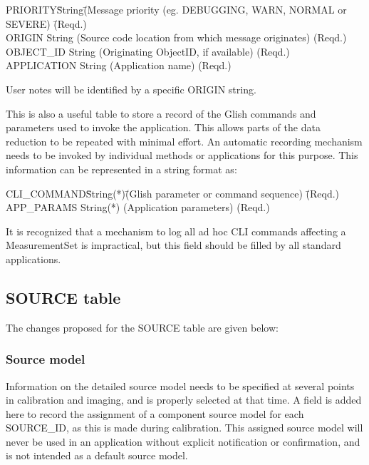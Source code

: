 \documentclass{article}
\begin{document}
\begin{tabbing}
PRIORITY\quad\quad\quad \= String\quad\quad \= 
(Message priority (eg. DEBUGGING, WARN, NORMAL or SEVERE)
 \quad\quad \= (Reqd.) \\
ORIGIN             \> String  \> 
(Source code location from which message originates) \> (Reqd.) \\
OBJECT\_ID         \> String  \>
(Originating ObjectID, if available) \> (Reqd.) \\
APPLICATION        \> String \>
(Application name) \> (Reqd.) \\
\end{tabbing}

User notes will be identified by a specific ORIGIN string.

This is also a useful table to store a record of the Glish commands
and parameters used to invoke the application. This allows parts of
the data reduction to be repeated with minimal effort. An automatic
recording mechanism needs to be invoked by individual methods or
applications for this purpose. This information can be represented in
a string format as:

\begin{tabbing}
CLI\_COMMAND\quad\quad \= String(*)\quad\quad \= 
(Glish parameter or command sequence)
 \quad\quad \= (Reqd.) \\
APP\_PARAMS \> String(*) \> (Application parameters) \> (Reqd.)
\end{tabbing}

 It is recognized that a mechanism to log all ad hoc CLI commands
affecting a MeasurementSet is impractical, but this field should be
filled by all standard applications.

\subsection{SOURCE table}

The changes proposed for the SOURCE table are given below:

\subsubsection{Source model}

Information on the detailed source model needs to be specified at
several points in calibration and imaging, and is properly selected at
that time. A field is added here to record the assignment of a
component source model for each SOURCE\_ID, as this is made during
calibration. This assigned source model will never be used in an
application without explicit notification or confirmation, and is not
intended as a default source model.
\end{document}
